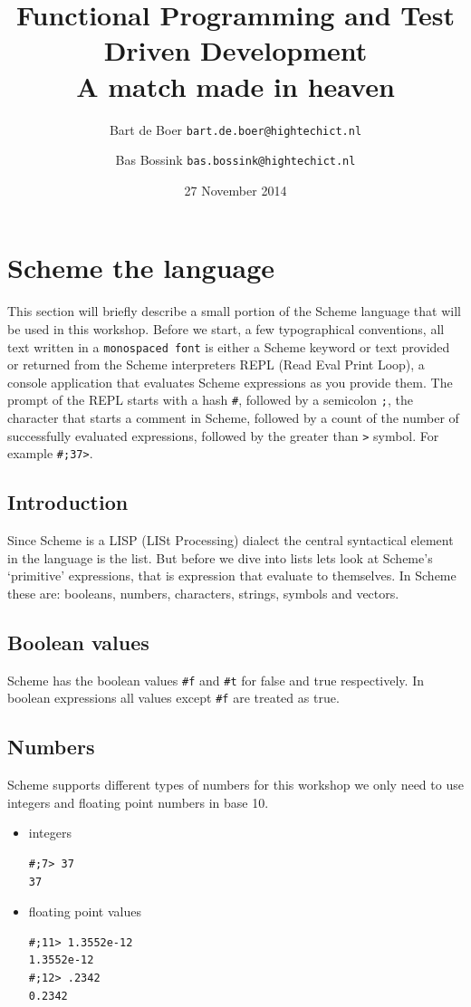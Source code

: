 \documentclass[12pt,a4paper,english,twoside]{article}
\author{
    Bart de Boer \texttt{bart.de.boer@hightechict.nl}
    \and
    Bas Bossink \texttt{bas.bossink@hightechict.nl}
}
\date{27 November 2014}
\title{Functional Programming and Test Driven Development\\
\vspace{2 mm} {\large A match made in heaven}}
\begin{document}
\maketitle
\section{Scheme the language}
This section will briefly describe a small portion of the Scheme language that 
will be used in this workshop.
Before we start, a few typographical conventions, all text written in a 
\texttt{monospaced font} is either a Scheme keyword or text provided or 
returned from the Scheme interpreters REPL (Read Eval Print Loop), a console 
application that evaluates Scheme expressions as you provide them. The prompt 
of the REPL starts with a hash \texttt{\#}, followed by a semicolon \texttt{;}, the 
character that starts a comment in Scheme, followed by a count of the number 
of successfully evaluated expressions, followed by the greater than \texttt{>} 
symbol. For example \texttt{\#;37>}.
\subsection{Introduction}
Since Scheme is a LISP (LISt Processing) dialect the central syntactical 
element in the language is the list. But before we dive into lists lets look 
at Scheme's `primitive' expressions, that is expression that evaluate to 
themselves. In Scheme these are: booleans, numbers, characters, strings, 
symbols and vectors.
\subsection{Boolean values}
Scheme has the boolean values \texttt{\#f} and \texttt{\#t} for false and true 
respectively. In boolean expressions all values except \texttt{\#f} are 
treated as true.
\subsection{Numbers}
Scheme supports different types of numbers for this workshop we only need to 
use integers and floating point numbers in base 10.
\begin{itemize}
\item integers 
\begin{lstlisting}
#;7> 37
37
\end{lstlisting}
\item floating point values
\begin{lstlisting}
#;11> 1.3552e-12
1.3552e-12 
#;12> .2342
0.2342
\end{lstlisting}
\end{itemize}
\end{document}
